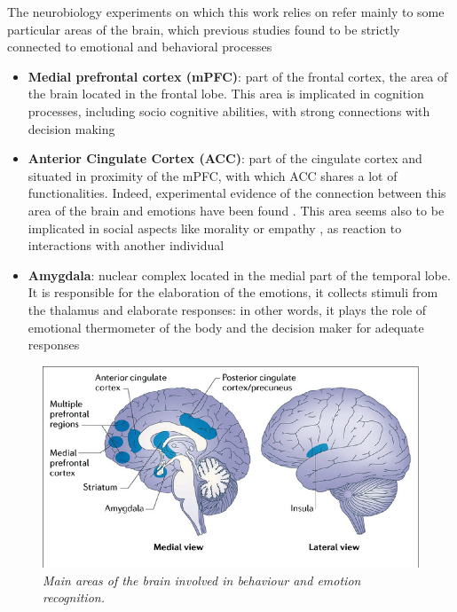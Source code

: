 \documentclass[12pt, a4paper]{report}
\begin{document}
	
	The neurobiology experiments on which this work relies on refer mainly to some particular areas of the brain, which previous studies found to be strictly connected to emotional and behavioral processes \cite{2} %
	\begin{itemize}
		
		\item \textbf{Medial prefrontal cortex (mPFC)}:  part of the frontal cortex, the area of the brain located in the frontal lobe. This area is implicated in cognition processes, including socio cognitive abilities,  with strong connections with decision making \cite{3} %
		
		\item \textbf{Anterior Cingulate Cortex (ACC)}: part of the cingulate cortex and situated in proximity of the mPFC,  with which  ACC shares a lot of functionalities. Indeed, experimental evidence of the connection between this area of the brain and emotions have been found \cite{4}. %
		 This area seems also to be implicated in social aspects like morality or empathy \cite{5}, %
		  as reaction to interactions with another individual
		
		\item \textbf{Amygdala}: nuclear complex located in the medial part of the temporal lobe. It is responsible for the elaboration of the emotions, it collects stimuli from the thalamus and elaborate responses: in other words, it plays the role of emotional thermometer of the body and the decision maker for adequate responses \cite{6} %
	\end{itemize}


	
	\begin{figure}[H]
		\begin{center}
			\includegraphics[scale=.55]{brain.png} 
		\end{center} 
		\caption{\textit{Main areas of the brain involved in behaviour and emotion recognition.}}
		
	\end{figure}
\end{document}
